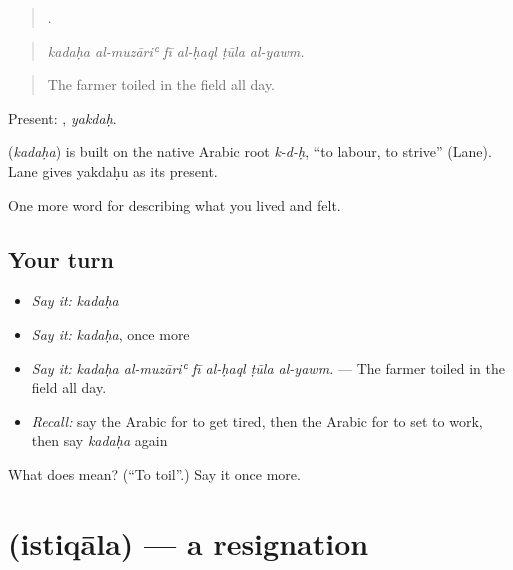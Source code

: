 \begin{quote}
     .
\end{quote}

\begin{quote}
\emph{kadaḥa al-muzāriʿ fī al-ḥaql ṭūla al-yawm.}
\end{quote}

\begin{quote}
The farmer toiled in the field all day.
\end{quote}

Present: , \emph{yakdaḥ}.

\begin{cousinweb}
\textbf{} (\emph{kadaḥa}) is built on the native Arabic root \emph{k-d-ḥ}, \textquotedblleft{}to labour, to strive\textquotedblright{} (Lane). Lane gives yakdaḥu as its present.
\end{cousinweb}

\begin{grammarlens}[title={What you've built}]
One more word for describing what you lived and felt.
\end{grammarlens}

\subsection*{Your turn}
\begin{itemize}
\raggedright
  \item \emph{Say it:} \emph{kadaḥa}
  \item \emph{Say it:} \emph{kadaḥa}, once more
  \item \emph{Say it:} \emph{kadaḥa al-muzāriʿ fī al-ḥaql ṭūla al-yawm.} — The farmer toiled in the field all day.
  \item \emph{Recall:} say the Arabic for to get tired, then the Arabic for to set to work, then say \emph{kadaḥa} again
\end{itemize}

\begin{tcolorbox}[breakable,colback=teal!4,colframe=teal!35!black,title={Before you move on}]
What does  mean? (\textquotedblleft{}To toil\textquotedblright{}.) Say it once more.
\end{tcolorbox}
\section[\texorpdfstring{\ar{استقالة} (istiqāla)}{استقالة (istiqāla)}]{ (istiqāla) — a resignation}

